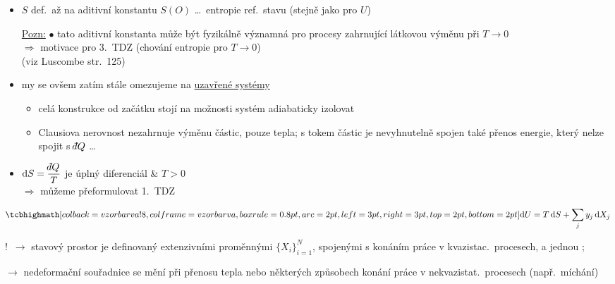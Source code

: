\begin{itemize}
  \item $S$ def.\ až na aditivní konstantu \quad $S(O)$ \dots\ entropie ref.\ stavu (stejně jako pro $U$)

  \underline{Pozn:} $\bullet$ tato aditivní konstanta může být fyzikálně významná pro procesy zahrnující látkovou výměnu při $T\to 0$ \\
  \hspace*{2.5em}$\Rightarrow$ motivace pro 3.\ TDZ (chování entropie pro $T\to 0$) \\
  \hspace*{2.5em}(viz Luscombe str.\ 125)
  \item my se ovšem zatím stále omezujeme na \underline{uzavřené systémy} \pozor{!}
  \begin{itemize}[nosep]
    \item[--] celá konstrukce od začátku stojí na možnosti systém adiabaticky izolovat
    \item[--] Clausiova nerovnost nezahrnuje výměnu částic, pouze tepla; s tokem částic je nevyhnutelně spojen také přenos energie, který nelze spojit s $\dbar Q$ \dots
  \end{itemize}
\end{itemize}

\begin{itemize}
  \item $\dd S = \dfrac{\dbar Q}{T}$ je úplný diferenciál \& $T > 0$ \\
  $\Rightarrow$ můžeme přeformulovat 1.\ TDZ
\end{itemize}

\begin{minipage}{0.4\textwidth}
\begin{veta}
\[ \vzorec{\dd U = T\,\dd S + \sum_j y_j\,\dd X_j} \]
\end{veta}
\end{minipage}
\hfill
\begin{minipage}{0.56\textwidth}
{\color{Red}\Large!}\ $\to$ stavový prostor je definovaný  extenzivními proměnnými $\{X_i\}_{i=1}^{N}$, spojenými s konáním práce v kvazistac.\ procesech, a jednou ;
\end{minipage}

\hspace*{1.5em}$\to$ nedeformační souřadnice se mění při přenosu tepla nebo některých způsobech konání práce v nekvazistat.\ procesech (např.\ míchání)

